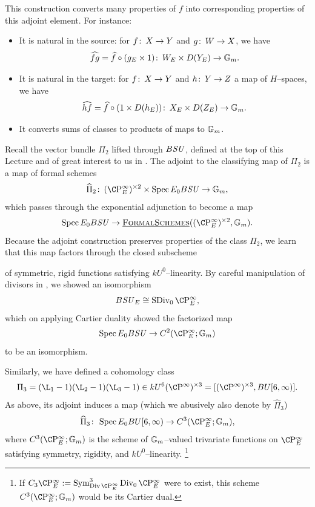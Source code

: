 \begin{remark}
This construction converts many properties of \(f\) into corresponding properties of this adjoint element.
For instance:
\begin{itemize}
    \item It is natural in the source: for \(f\colon\thinspace X \to Y\) and \(g\colon\thinspace W \to X\), we have \[\widehat{fg} = \widehat{f} \circ (g_E \times 1)\colon\thinspace W_E \times D(Y_E) \to \mathbb G_m.\]
    \item It is natural in the target: for \(f\colon\thinspace X \to Y\) and \(h\colon\thinspace Y \to Z\) a map of \(H\)--spaces, we have \[\widehat{hf} = \widehat{f} \circ (1 \times D(h_E))\colon\thinspace X_E \times D(Z_E) \to \mathbb G_m.\]
    \item It converts sums of classes to products of maps to \(\mathbb G_m\).
\end{itemize}
\end{remark}

\begin{example}\label{AdjointBSUExample}
Recall the vector bundle \(\Pi_2\) lifted through \(B\mathit{SU}\), defined at the top of this Lecture and of great interest to us in .
The adjoint to the classifying map of \(\Pi_2\) is a map of formal schemes \[\widehat \Pi_2\co (\CP^\infty_E)^{\times 2} \times \Spec E_0 B\SU \to \Gm,\] which passes through the exponential adjunction to become a map \[\Spec E_0 B\SU \to \InternalHom{FormalSchemes}((\CP^\infty_E)^{\times 2}, \Gm).\]
Because the adjoint construction preserves properties of the class \(\Pi_2\), we learn that this map factors through the closed subscheme
\begin{center}
\end{center}
of symmetric, rigid functions satisfying \(kU^0\)--linearity.
By careful manipulation of divisors in , we showed an isomorphism \[B\SU_E \cong \SDiv_0 \CP^\infty_E,\] which on applying Cartier duality showed the factorized map \[\Spec E_0 B\SU \to C^2(\CP^\infty_E; \Gm)\] to be an isomorphism.
\end{example}

\begin{example}
Similarly, we have defined a cohomology class \[\Pi_3 = (\L_1 - 1)(\L_2 - 1)(\L_3 - 1) \in kU^6(\CP^\infty)^{\times 3} = [(\CP^\infty)^{\times 3}, BU[6, \infty)].\]
As above, its adjoint induces a map (which we abusively also denote by \(\widehat \Pi_3\)) \[\widehat \Pi_3\co \Spec E_0 BU[6, \infty) \to C^3(\CP^\infty_E; \Gm),\] where \(C^3(\CP^\infty_E; \Gm)\) is the scheme of \(\mathbb G_m\)--valued trivariate functions on \(\CP^\infty_E\) satisfying symmetry, rigidity, and \(kU^0\)--linearity.%
\footnote{%
If \(C_3 \CP^\infty_E := \Sym^3_{\Div \CP^\infty_E} \Div_0 \CP^\infty_E\) were to exist, this scheme \(C^3(\CP^\infty_E; \Gm)\) would be its Cartier dual.
}
\end{example}

